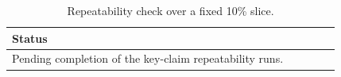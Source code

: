 \begin{table}[t]
\centering
\caption{Repeatability check over a fixed 10\% slice.}
\label{tab:repeatability}
\begin{tabular}{p{0.82\linewidth}}
\hline
Status \\
\hline
Pending completion of the key-claim repeatability runs. \\
\hline
\end{tabular}
\end{table}

